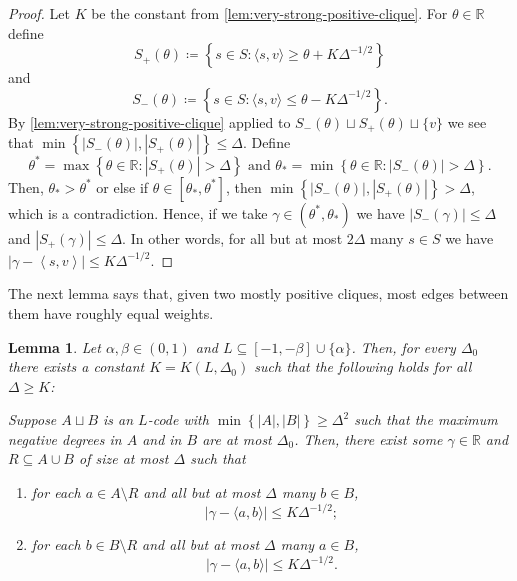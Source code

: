 \documentclass[reqno, 11pt]{amsart}
\newtheorem{lemma}[theorem]{Lemma}
\theoremstyle{definition}
\theoremstyle{remark}
\newcommand{\ang}[1]{\left\langle #1 \right\rangle}
\newcommand{\set}[1]{\left\{ #1 \right\}}
\newcommand{\RR}{\mathbb{R}}
\begin{document}
\begin{proof}
	Let $K$ be the constant from \cref{lem:very-strong-positive-clique}. For $\theta \in \RR$ define 	
\[
		S_+(\theta) \coloneqq \left\{s \in S : \langle s, v\rangle \geq \theta + K\Delta^{-1/2}\right\}
  \]
  and
  \[
		S_-(\theta) \coloneqq \left\{s \in S : \langle s, v\rangle \leq \theta - K\Delta^{-1/2}\right\}.
  \]
	By \cref{lem:very-strong-positive-clique} applied to $S_-(\theta) \sqcup S_+(\theta) \sqcup \{v\}$ we see that $\min\set{|S_-(\theta)|, |S_+(\theta)|} \leq \Delta$. Define
 \[
     \theta^* = \max \set{\theta \in \RR : |S_+(\theta)| > \Delta} \text{ and } \theta_* = \min \set{\theta \in \RR : |S_-(\theta)| > \Delta}.
 \]
 Then, $\theta_* > \theta^*$ or else if $\theta \in [\theta_*, \theta^*]$, then $\min\set{|S_-(\theta)|, |S_+(\theta)|} > \Delta$, which is a contradiction. Hence, if we take $\gamma \in (\theta^*, \theta_*)$ we have $ |S_-(\gamma)| \leq \Delta$ and $|S_+(\gamma)| \leq \Delta$. In other words, for all but at most $2\Delta$ many $s \in S$ we have $|\gamma - \ang{s,v}| \leq K \Delta^{-1/2}$. 
\end{proof}


The next lemma says that, given two mostly positive cliques, most edges between them have roughly equal weights.

\begin{lemma}\label{lem:two-positive-cliques}
Let $ \alpha, \beta \in (0,1)$ and $L \subseteq [-1,-\beta]\cup\{\alpha\}$. Then, for every $\Delta_0$ there exists a constant $K = K(L, \Delta_0) $ such that the following holds for all $\Delta \geq K$: 

Suppose $A \sqcup B$ is an $L$-code with $\min\set{|A|,|B|} \geq \Delta^2$ such that the maximum negative degrees in $A$ and in $B$ are at most $\Delta_0$. Then, there exist some $\gamma \in \RR$ and $R \subseteq A \cup B$  of size at most $\Delta$ such that
\begin{enumerate}
	\item for each $a \in A \setminus R$ and all but at most $\Delta$ many $b \in B$,
	\[
		|\gamma - \langle a,b\rangle| \leq K\Delta^{-1/2};
	\]
	\item for each $b \in B \setminus R$ and all but at most $\Delta$ many $a \in B$,
	\[
		|\gamma - \langle a,b\rangle| \leq K\Delta^{-1/2}.
	\]
\end{enumerate}
\end{lemma}	
\end{document}
